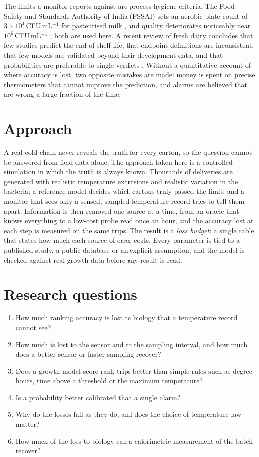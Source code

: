 \documentclass[11pt,a4paper,twoside,openany]{book}
\theoremstyle{plain}\newtheorem{proposition}{Proposition}\newtheorem{corollary}{Corollary}
\theoremstyle{definition}\newtheorem{definition}{Definition}[chapter]
\begin{document}
The limits a monitor reports against are process-hygiene criteria. The Food Safety and Standards Authority of India (FSSAI) sets an aerobic plate count of $3\times10^4$\,CFU\,mL$^{-1}$ for pasteurised milk \cite{fssai2024}, and quality deteriorates noticeably near $10^6$\,CFU\,mL$^{-1}$ \cite{martin2021,lin2016}; both are used here. A recent review of fresh dairy concludes that few studies predict the end of shelf life, that endpoint definitions are inconsistent, that few models are validated beyond their development data, and that probabilities are preferable to single verdicts \cite{lima2026}. Without a quantitative account of where accuracy is lost, two opposite mistakes are made: money is spent on precise thermometers that cannot improve the prediction, and alarms are believed that are wrong a large fraction of the time.

\section{Approach}
A real cold chain never reveals the truth for every carton, so the question cannot be answered from field data alone. The approach taken here is a controlled simulation in which the truth is always known. Thousands of deliveries are generated with realistic temperature excursions and realistic variation in the bacteria; a reference model decides which cartons truly passed the limit; and a monitor that sees only a sensed, sampled temperature record tries to tell them apart. Information is then removed one source at a time, from an oracle that knows everything to a low-cost probe read once an hour, and the accuracy lost at each step is measured on the same trips. The result is a \emph{loss budget}: a single table that states how much each source of error costs. Every parameter is tied to a published study, a public database or an explicit assumption, and the model is checked against real growth data before any result is read.

\section{Research questions}
\begin{enumerate}[label=RQ\arabic*.,leftmargin=3em]
\item How much ranking accuracy is lost to biology that a temperature record cannot see?
\item How much is lost to the sensor and to the sampling interval, and how much does a better sensor or faster sampling recover?
\item Does a growth-model score rank trips better than simple rules such as degree-hours, time above a threshold or the maximum temperature?
\item Is a probability better calibrated than a single alarm?
\item Why do the losses fall as they do, and does the choice of temperature law matter?
\item How much of the loss to biology can a calorimetric measurement of the batch recover?
\end{enumerate}
\end{document}
